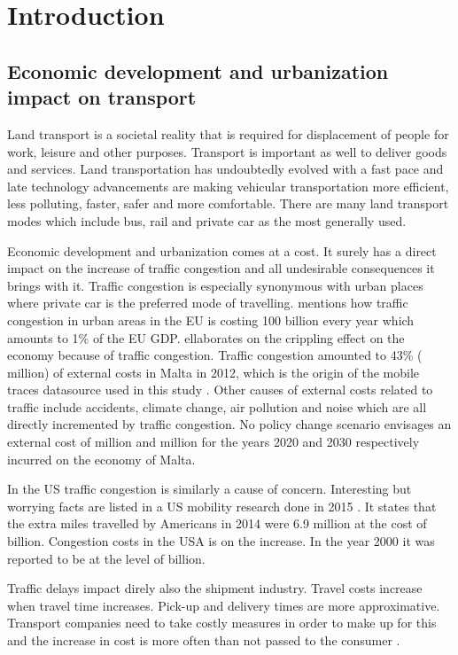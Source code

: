 \documentclass[12pt, a4paper]{report}
\theoremstyle{definition}
\theoremstyle{definition}%
\theoremstyle{definition}%
\theoremstyle{definition}%
\theoremstyle{definition}%
\theoremstyle{definition}%
\begin{document}
\chapter{Introduction}

\section{Economic development and urbanization impact on transport}

Land transport is a societal reality that is required for displacement of people for work, 
leisure and other purposes. Transport is important as well to deliver goods and services. Land transportation has undoubtedly evolved with a fast pace and late technology advancements are making vehicular transportation more efficient, less polluting, faster, safer and more comfortable. There are many land transport modes which include bus, rail and private car as the most generally used.

Economic development and urbanization comes at a cost. It surely has a direct impact on the increase of traffic congestion and all undesirable consequences it brings with it. Traffic congestion is especially synonymous with urban places where private car is the preferred mode of travelling. \cite{EUTransportDirectorate2018} mentions how traffic congestion in urban areas in the EU is costing 100 billion every year which amounts to 1\% of the EU GDP. \cite{Colak2015} ellaborates on the crippling effect on the economy because of traffic congestion. Traffic congestion amounted to 43\% ( million) of external costs in Malta in 2012, which is the origin of the mobile traces datasource used in this study \cite{Attard2015}. Other causes of external costs related to traffic include accidents, climate change, air pollution and noise which are all directly incremented by traffic congestion. No policy change scenario envisages an external cost of  million and  million for the years 2020 and 2030 respectively incurred on the economy of Malta.

In the US traffic congestion is similarly a cause of concern. Interesting but worrying facts are listed in a US mobility research done in 2015 \cite{Schrank.2015}. It states that the extra miles travelled by Americans in 2014 were 6.9 million at the cost of  billion. Congestion costs in the USA is on the increase. In the year 2000 it was reported to be at the level of  billion.

Traffic delays impact direly also the shipment industry. Travel costs increase when travel time increases.  Pick-up and delivery times are more approximative. Transport companies need to take costly measures in order to make up for this and the increase in cost is more often than not passed to the consumer  \cite{Schrank.2015} \cite{CambridgeSystematicsInc.2005}.
\end{document}
